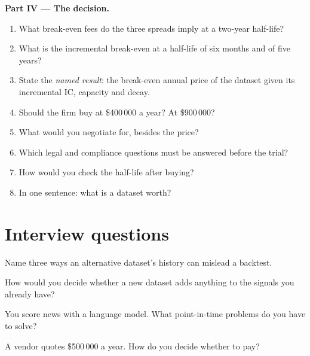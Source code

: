 \begin{problem}
\medskip\noindent\textbf{Part IV --- The decision.}
\begin{enumerate}[resume]
\item What break-even fees do the three spreads imply at a two-year half-life?
\item What is the incremental break-even at a half-life of six months and of five years?
\item State the \emph{named result}: the break-even annual price of the dataset given its incremental IC, capacity and decay.
\item Should the firm buy at \$400\,000 a year? At \$900\,000?
\item What would you negotiate for, besides the price?
\item Which legal and compliance questions must be answered before the trial?
\item How would you check the half-life after buying?
\item In one sentence: what is a dataset worth?
\end{enumerate}
\end{problem}

\section{Interview questions}

\begin{interviewq}\label{iq:rs:alternative-and-text-data:1}
Name three ways an alternative dataset's history can mislead a backtest.
\end{interviewq}

\begin{interviewq}\label{iq:rs:alternative-and-text-data:2}
How would you decide whether a new dataset adds anything to the signals you already have?
\end{interviewq}

\begin{interviewq}\label{iq:rs:alternative-and-text-data:3}
You score news with a language model. What point-in-time problems do you have to solve?
\end{interviewq}

\begin{interviewq}\label{iq:rs:alternative-and-text-data:4}
A vendor quotes \$500\,000 a year. How do you decide whether to pay?
\end{interviewq}

